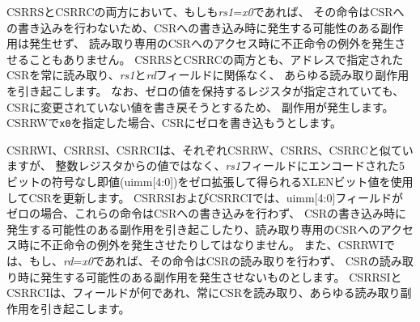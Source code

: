 CSRRSとCSRRCの両方において、もしも{\em rs1}={\em x0}であれば、
その命令はCSRへの書き込みを行わないため、CSRへの書き込み時に発生する可能性のある副作用は発生せず、
読み取り専用のCSRへのアクセス時に不正命令の例外を発生させることもありません。
CSRRSとCSRRCの両方とも、アドレスで指定されたCSRを常に読み取り、{\em rs1}と{\em rd}フィールドに関係なく、
あらゆる読み取り副作用を引き起こします。
なお、ゼロの値を保持するレジスタが指定されていても、CSRに変更されていない値を書き戻そうとするため、
副作用が発生します。 CSRRWで{\tt x0}を指定した場合、CSRにゼロを書き込もうとします。

\begin{comment}
The CSRRWI, CSRRSI, and CSRRCI variants are similar to CSRRW, CSRRS,
and CSRRC respectively, except they update the CSR using an XLEN-bit
value obtained by zero-extending a 5-bit unsigned immediate (uimm[4:0]) field
encoded in the {\em rs1} field instead of a value from an integer
register.  For CSRRSI and CSRRCI, if the uimm[4:0] field is zero, then
these instructions will not write to the CSR, and shall not cause any
of the side effects that might otherwise occur on a CSR write, nor raise
illegal instruction exceptions on accesses to read-only CSRs.
For CSRRWI, if {\em rd}={\tt x0}, then the instruction shall not read the
CSR and shall not cause any of the side effects that might occur on a
CSR read.  Both CSRRSI and CSRRCI will always read the CSR and cause
any read side effects regardless of {\em rd} and {\em rs1} fields.
\end{comment}

CSRRWI、CSRRSI、CSRRCIは、それぞれCSRRW、CSRRS、CSRRCと似ていますが、
整数レジスタからの値ではなく、{\em rs1}フィールドにエンコードされた5ビットの符号なし即値(uimm[4:0])をゼロ拡張して得られるXLENビット値を使用してCSRを更新します。
CSRRSIおよびCSRRCIでは、uimm[4:0]フィールドがゼロの場合、これらの命令はCSRへの書き込みを行わず、
CSRの書き込み時に発生する可能性のある副作用を引き起こしたり、読み取り専用のCSRへのアクセス時に不正命令の例外を発生させたりしてはなりません。
また、CSRRWIでは、もし、{\em rd}={\em x0}であれば、その命令はCSRの読み取りを行わず、
CSRの読み取り時に発生する可能性のある副作用を発生させないものとします。
CSRRSIとCSRRCIは、フィールドが何であれ、常にCSRを読み取り、あらゆる読み取り副作用を引き起こします。

